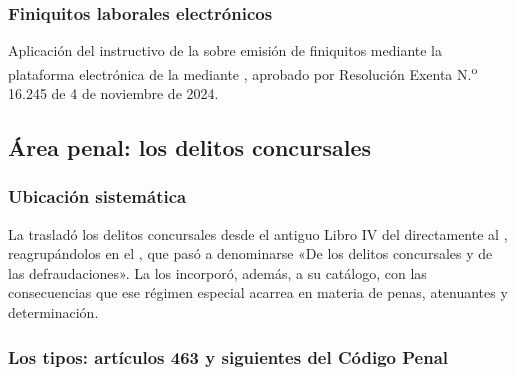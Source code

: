 \subsubsection{Finiquitos laborales electrónicos}

Aplicación del instructivo de la \superir{} sobre emisión de finiquitos mediante la
plataforma electrónica de la \dt{} mediante 
\parencite{instructivo-i6}, aprobado por Resolución Exenta N.\textsuperscript{o} 16.245 de 4 de
noviembre de 2024.

\subsection{Área penal: los delitos concursales}

\subsubsection{Ubicación sistemática}

La \LIR{} \citeyearpar{ley-20720} trasladó los delitos concursales desde el antiguo Libro IV
del \ccom{} directamente al \cpen{}, reagrupándolos en el , que pasó a denominarse «De los delitos concursales y de las
defraudaciones». La \Ldeleco{} \citeyearpar{ley-21595} los incorporó, además, a su catálogo,
con las consecuencias que ese régimen especial acarrea en materia de penas, atenuantes y
determinación.

\subsubsection{Los tipos: artículos 463 y siguientes del Código Penal}

